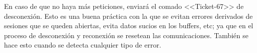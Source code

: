 En caso de que no haya más peticiones, enviará el comado <<Ticket-67>> de desconexión. Esto es una buena práctica con la que se evitan errores derivados de sesiones que se queden abiertas, evita datos sucios en los buffers, etc; ya que en el proceso de desconexión y reconexión se resetean las comunicaciones. También se hace esto cuando se detecta cualquier tipo de error.























